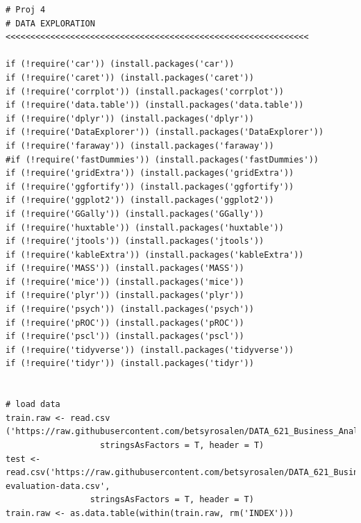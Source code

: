 \documentclass[]{article}
\begin{document}
\begin{verbatim}
# Proj 4
# DATA EXPLORATION <<<<<<<<<<<<<<<<<<<<<<<<<<<<<<<<<<<<<<<<<<<<<<<<<<<<<<<<<<<<<

if (!require('car')) (install.packages('car'))
if (!require('caret')) (install.packages('caret'))
if (!require('corrplot')) (install.packages('corrplot'))
if (!require('data.table')) (install.packages('data.table'))
if (!require('dplyr')) (install.packages('dplyr'))
if (!require('DataExplorer')) (install.packages('DataExplorer'))
if (!require('faraway')) (install.packages('faraway'))
#if (!require('fastDummies')) (install.packages('fastDummies'))
if (!require('gridExtra')) (install.packages('gridExtra'))
if (!require('ggfortify')) (install.packages('ggfortify'))
if (!require('ggplot2')) (install.packages('ggplot2'))
if (!require('GGally')) (install.packages('GGally'))
if (!require('huxtable')) (install.packages('huxtable'))
if (!require('jtools')) (install.packages('jtools'))
if (!require('kableExtra')) (install.packages('kableExtra'))
if (!require('MASS')) (install.packages('MASS'))
if (!require('mice')) (install.packages('mice'))
if (!require('plyr')) (install.packages('plyr'))
if (!require('psych')) (install.packages('psych'))
if (!require('pROC')) (install.packages('pROC'))
if (!require('pscl')) (install.packages('pscl'))
if (!require('tidyverse')) (install.packages('tidyverse'))
if (!require('tidyr')) (install.packages('tidyr'))


# load data
train.raw <- read.csv ('https://raw.githubusercontent.com/betsyrosalen/DATA_621_Business_Analyt_and_Data_Mining/master/project4_insurance/data/insurance_training_data.csv',
                   stringsAsFactors = T, header = T)
test <- read.csv('https://raw.githubusercontent.com/betsyrosalen/DATA_621_Business_Analyt_and_Data_Mining/master/project4_insurance/data/insurance-evaluation-data.csv',
                 stringsAsFactors = T, header = T)
train.raw <- as.data.table(within(train.raw, rm('INDEX')))


\end{verbatim}
\end{document}
